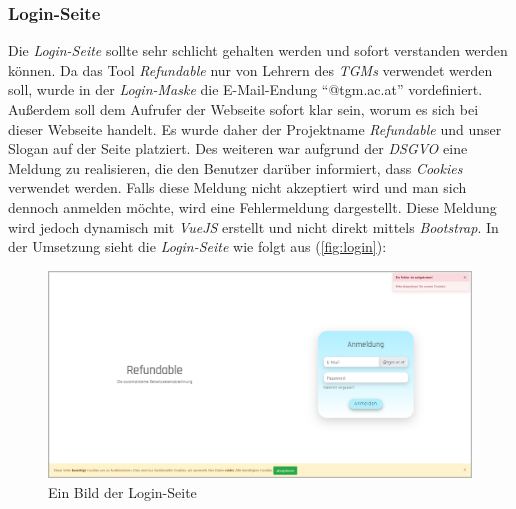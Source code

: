 \subsubsection{Login-Seite}
\label{chapter:implementierung-frontend-komponenten-login}
Die \textit{Login-Seite} sollte sehr schlicht gehalten werden und sofort verstanden werden können. Da das Tool \textit{Refundable} nur von Lehrern des \textit{TGMs} verwendet werden soll, wurde in der \textit{Login-Maske} die E-Mail-Endung \enquote{@tgm.ac.at} vordefiniert. Außerdem soll dem Aufrufer der Webseite sofort klar sein, worum es sich bei dieser Webseite handelt. Es wurde daher der Projektname \textit{Refundable} und unser Slogan auf der Seite platziert. Des weiteren war aufgrund der \textit{DSGVO} eine Meldung zu realisieren, die den Benutzer darüber informiert, dass \textit{Cookies} verwendet werden. Falls diese Meldung nicht akzeptiert wird und man sich dennoch anmelden möchte, wird eine Fehlermeldung dargestellt. Diese Meldung wird jedoch dynamisch mit \textit{VueJS} erstellt und nicht direkt mittels \textit{Bootstrap}. In der Umsetzung sieht die \textit{Login-Seite} wie folgt aus (\autoref{fig:login}):
\begin{figure}[H]
	\centering
	\includegraphics[width=1\linewidth]{images/ldehner_implementierung/login}
	\caption[Login Seite]{Ein Bild der Login-Seite}
	\label{fig:login}
\end{figure}
